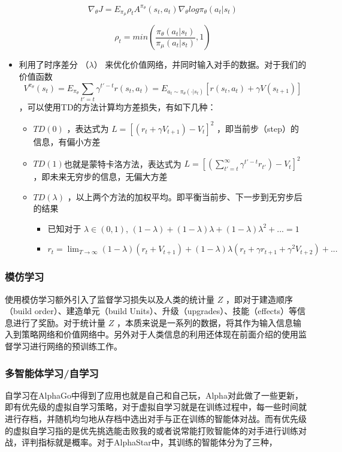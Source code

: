 \begin{itemize}
$$
\nabla_{\theta}J = E_{\pi_{\mu}}\rho_tA^{\pi_{\theta}}(s_t,a_t)\nabla_{\theta}log \pi_{\theta}(a_t|s_t)
$$

$$
\rho_t = min(\frac{\pi_{\theta} (a_t|s_t)}{\pi_{\mu} (a_t|s_t)},1)
$$
\item 利用了时序差分 （$\lambda$） 来优化价值网络，并同时输入对手的数据。对于我们的价值函数 
$$
V^{\pi_{\theta}}(s_t)=E_{\pi_{\theta}}\sum_{t'=t}\gamma^{t'-t}r(s_t,a_t)=E_{a_t\sim\pi_{\theta}(\cdot|s_t)}[r(s_t,a_t)+\gamma V(s_{t+1})]
$$
，可以使用TD的方法计算均方差损失，有如下几种：
\begin{itemize}
    \item $TD(0)$ ，表达式为 $L = [(r_t+\gamma V_{t+1})-V_t]^2$ ，即当前步（step）的信息，有偏小方差
    \item $TD(1)$也就是蒙特卡洛方法，表达式为 $L = [(\sum_{t'=t}^\infty\gamma^{t'-t}r_{t'})-V_t]^2$，即未来无穷步的信息，无偏大方差
    \item $TD(\lambda)$ ，以上两个方法的加权平均。即平衡当前步、下一步到无穷步后的结果
    \begin{itemize}
        \item 已知对于 $\lambda \in (0,1)$, $(1-\lambda)+(1-\lambda)\lambda+(1-\lambda)\lambda ^2+...=1$
        \item $r_t = \lim_{T\rightarrow\infty} (1-\lambda)(r_t+V_{t+1})+(1-\lambda)\lambda(r_t+\gamma r_{t+1}+\gamma^2 V_{t+2})+...$
    \end{itemize}
    
\end{itemize}
\end{itemize}
 
\subsubsection{模仿学习} 
使用模仿学习额外引入了监督学习损失以及人类的统计量 $Z$ ，即对于建造顺序（build order）、建造单元（build Units）、升级（upgrades）、技能（effects）等信息进行了奖励。对于统计量 $Z$ ，本质来说是一系列的数据，将其作为输入信息输入到策略网络和价值网络中。另外对于人类信息的利用还体现在前面介绍的使用监督学习进行网络的预训练工作。

\subsubsection{多智能体学习/自学习} 

自学习在AlphaGo中得到了应用也就是自己和自己玩，Alpha对此做了一些更新，即有优先级的虚拟自学习策略，对于虚拟自学习就是在训练过程中，每一些时间就进行存档，并随机均匀地从存档中选出对手与正在训练的智能体对战。而有优先级的虚拟自学习指的是优先挑选能击败我的或者说常能打败智能体的对手进行训练对战，评判指标就是概率。对于AlphaStar中，其训练的智能体分为了三种，

